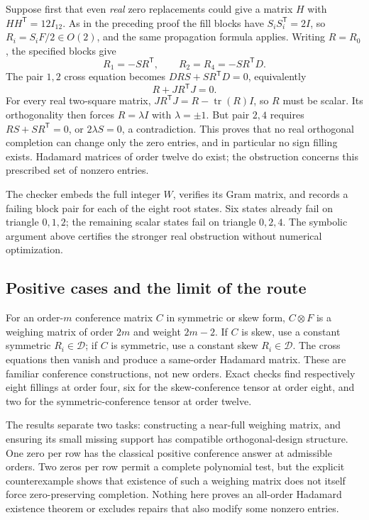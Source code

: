 \documentclass[11pt]{article}
\begin{document}
Suppose first that even \emph{real} zero replacements could give
a matrix $H$ with $HH^{\mathsf T}=12I_{12}$. As in the preceding
proof the fill blocks have $S_iS_i^{\mathsf T}=2I$, so
$R_i=S_iF/2\in O(2)$, and the same propagation formula applies.
Writing $R=R_0$, the specified blocks give
\[
 R_1=-SR^{\mathsf T},\qquad
 R_2=R_4=-SR^{\mathsf T}D.
\]
The pair $1,2$ cross equation becomes
$DRS+SR^{\mathsf T}D=0$, equivalently
\[
 R+JR^{\mathsf T}J=0.
\]
For every real two-square matrix,
$JR^{\mathsf T}J=R-\operatorname{tr}(R)I$, so $R$ must be
scalar. Its orthogonality then forces $R=\lambda I$ with
$\lambda=\pm1$. But pair $2,4$ requires
$RS+SR^{\mathsf T}=0$, or $2\lambda S=0$, a contradiction.
This proves that no real orthogonal completion can change only
the zero entries, and in particular no sign filling exists.
Hadamard matrices of order twelve do exist; the obstruction
concerns this prescribed set of nonzero entries.

The checker embeds the full integer $W$, verifies its Gram matrix,
and records a failing block pair for each of the eight root states.
Six states already fail on triangle $0,1,2$; the remaining scalar
states fail on triangle $0,2,4$. The symbolic argument above
certifies the stronger real obstruction without numerical optimization.

\subsection{Positive cases and the limit of the route}
For an order-$m$ conference matrix $C$ in symmetric or skew form,
$C\otimes F$ is a weighing matrix of order $2m$ and weight $2m-2$.
If $C$ is skew, use a constant symmetric $R_i\in\mathcal D$;
if $C$ is symmetric, use a constant skew $R_i\in\mathcal D$.
The cross equations then vanish and produce a same-order Hadamard
matrix. These are familiar conference constructions, not new orders.
Exact checks find respectively eight fillings at order four,
six for the skew-conference tensor at order eight, and two for
the symmetric-conference tensor at order twelve.

The results separate two tasks: constructing a near-full weighing
matrix, and ensuring its small missing support has compatible
orthogonal-design structure. One zero per row has the classical
positive conference answer at admissible orders. Two zeros per
row permit a complete polynomial test, but the explicit counterexample
shows that existence of such a weighing matrix does not itself
force zero-preserving completion. Nothing here proves an all-order
Hadamard existence theorem or excludes repairs that also modify
some nonzero entries.
\end{document}
